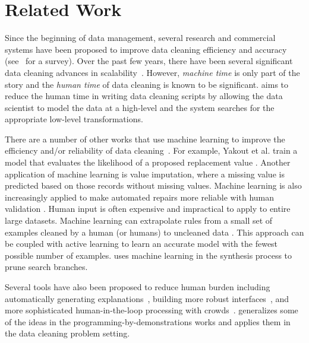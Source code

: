 \section{Related Work}
Since the beginning of data management, several research and commercial systems have been proposed to improve data cleaning efficiency and accuracy (see~\cite{rahm2000data} for a survey).
Over the past few years, there have been several significant data cleaning advances in scalability~\cite{wang1999sample, khayyat2015bigdansing, altowim2014progressive}.
However, \emph{machine time} is only part of the story and the \emph{human time} of data cleaning is known to be significant.
\sys aims to reduce the human time in writing data cleaning scripts by allowing the data scientist to model the data at a high-level and the system searches for the appropriate low-level transformations.

There are a number of other works that use machine learning to improve the efficiency and/or reliability of data cleaning~\cite{DBLP:journals/pvldb/YakoutENOI11,yakout2013don,gokhale2014corleone}.
For example, Yakout et al. train a model that evaluates the likelihood of a proposed replacement value \cite{yakout2013don}.
Another application of machine learning is value imputation, where a missing value is predicted based on those records without missing values.
Machine learning is also increasingly applied to make automated repairs more reliable with human validation \cite{DBLP:journals/pvldb/YakoutENOI11}.
Human input is often expensive and impractical to apply to entire large datasets.
Machine learning can extrapolate rules from a small set of examples cleaned by a human (or humans) to uncleaned data \cite{gokhale2014corleone, DBLP:journals/pvldb/YakoutENOI11}.
This approach can be coupled with active learning \cite{DBLP:journals/pvldb/MozafariSFJM14} to learn an accurate model with the fewest possible number of examples.
\sys uses machine learning in the synthesis process to prune search branches.


Several tools have also been proposed to reduce human burden including automatically generating explanations~\cite{DBLP:journals/pvldb/0002M13}, building more robust interfaces~\cite{wrangler,trifacta}, and more sophisticated human-in-the-loop processing with crowds~\cite{gokhale2014corleone, park2014crowdfill, DBLP:journals/pvldb/YakoutENOI11, chu2015katara, DBLP:journals/pvldb/HaasKWF015,marcus2015crowdsourced}.
\sys generalizes some of the ideas in the programming-by-demonstrations works and applies them in the data cleaning problem setting.

